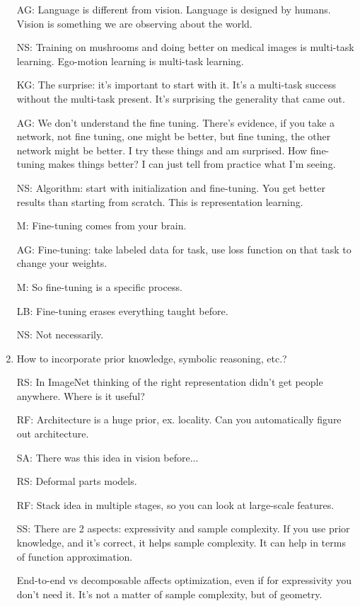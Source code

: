 \begin{enumerate}
AG: Language is different from vision. Language is designed by humans. Vision is something we are observing about the world.

NS: Training on mushrooms and doing better on medical images is multi-task learning. Ego-motion learning is multi-task learning. 

KG: The surprise: it's important to start with it. It's a multi-task success without the multi-task present. It's surprising the generality that came out.

AG: We don't understand the fine tuning. There's evidence, if you take a network, not fine tuning, one might be better, but fine tuning, the other network might be better. I try these things and am surprised. How fine-tuning makes things better? I can just tell from practice what I'm seeing.

NS: Algorithm: start with initialization and fine-tuning. You get better results than starting from scratch. This is representation learning.

M: Fine-tuning comes from your brain.

AG: Fine-tuning: take labeled data for task, use loss function on that task to change your weights.

M: So fine-tuning is a specific process.

LB: Fine-tuning erases everything taught before.

NS: Not necessarily.
\item
How to incorporate prior knowledge, symbolic reasoning, etc.?

RS: In ImageNet thinking of the right representation didn't get people anywhere. Where is it useful?

RF: Architecture is a huge prior, ex. locality. Can you automatically figure out architecture.

SA: There was this idea in vision before...

RS: Deformal parts models.

RF: Stack idea in multiple stages, so you can look at large-scale features.

SS: There are 2 aspects: expressivity and sample complexity. If you use prior knowledge, and it's correct, it helps sample complexity. It can help in terms of function approximation.

End-to-end vs decomposable affects optimization, even if for expressivity you don't need it. It's not a matter of sample complexity, but of geometry. 


\end{enumerate}
